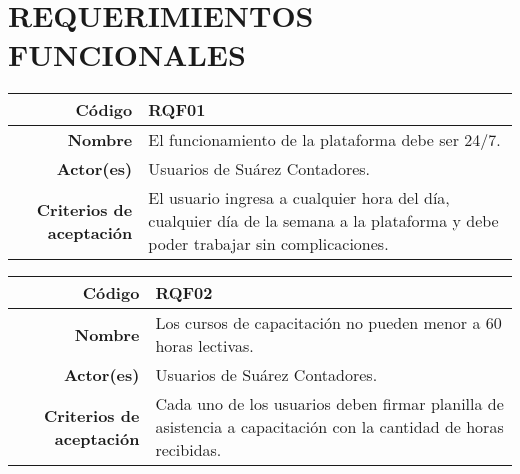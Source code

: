 \chapter{REQUERIMIENTOS FUNCIONALES}

%
\begin{table}[H]
	\centering
	\begin{tabular}{| r | p{10cm} |}
	\hline
	\textbf{C\'odigo} & \textbf{RQF01} \\
	\hline
	\textbf{Nombre} & El funcionamiento de la plataforma debe ser 24/7. \\
	\hline
	\textbf{Actor(es)} & Usuarios de Su\'arez Contadores. \\
	\hline
	\textbf{Criterios de aceptaci\'on} & 
		El usuario ingresa a cualquier hora del d\'ia, cualquier d\'ia de la semana a la plataforma
		y debe poder trabajar sin complicaciones.\\
	\hline
	\end{tabular}
\end{table}
%
\begin{table}[H]
	\centering
	\begin{tabular}{| r | p{10cm} |}
	\hline
	\textbf{C\'odigo} & \textbf{RQF02} \\
	\hline
	\textbf{Nombre} & Los cursos de capacitaci\'on no pueden menor a 60 horas lectivas.\\
	\hline
	\textbf{Actor(es)} & Usuarios de Su\'arez Contadores. \\
	\hline
	\textbf{Criterios de aceptaci\'on} & 
		Cada uno de los usuarios deben firmar planilla de asistencia a capacitaci\'on con la cantidad
		de horas recibidas.\\
	\hline
	\end{tabular}
\end{table}
%